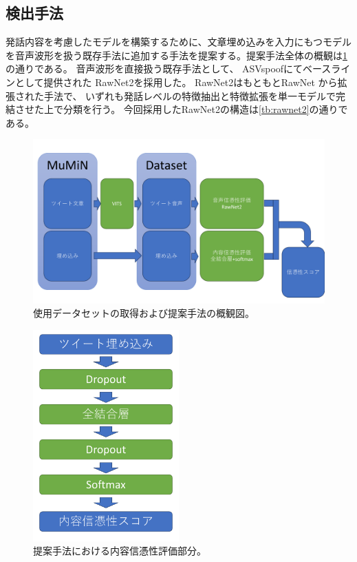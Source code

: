 \subsection{検出手法}
発話内容を考慮したモデルを構築するために、文章埋め込みを入力にもつモデルを音声波形を扱う既存手法に追加する手法を提案する。提案手法全体の概観は\cref{fig:allmodel}の通りである。
音声波形を直接扱う既存手法として、
ASVspoofにてベースラインとして提供された \cite{WANG2020101114}RawNet2を採用した。
RawNet2はもともとRawNet \cite{jung19b_interspeech}から拡張された手法で、
いずれも発話レベルの特徴抽出と特徴拡張を単一モデルで完結させた上で分類を行う。
今回採用したRawNet2の構造は\cref{tb:rawnet2}の通りである。

\begin{figure}[ht]
    \centering
    \includegraphics[width=\textwidth]{./figures/ieice_allFig.pdf}
    \caption{使用データセットの取得および提案手法の概観図。}
    \label{fig:allmodel}
\end{figure}


\begin{figure}[ht]
    \centering
    \includegraphics[width=0.5\textwidth]{./figures/ieice_nnfig.pdf} %
    \caption{提案手法における内容信憑性評価部分。}
    \label{fig:content}
\end{figure}

